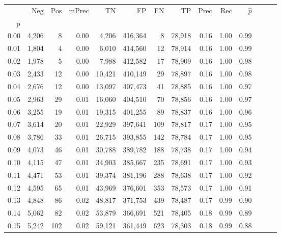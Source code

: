 \begin{tabular}{rrrrrrrrrrrrrr}
\toprule
{} &    Neg &    Pos & mPrec &       TN &       FP &      FN &      TP &  Prec &   Rec & $\hat{p}$ \\
p    &        &        &       &          &          &         &         &       &       &           \\
\midrule
0.00 &  4,206 &      8 &  0.00 &    4,206 &  416,364 &       8 &  78,918 &  0.16 &  1.00 &      0.99 \\
0.01 &  1,804 &      4 &  0.00 &    6,010 &  414,560 &      12 &  78,914 &  0.16 &  1.00 &      0.99 \\
0.02 &  1,978 &      5 &  0.00 &    7,988 &  412,582 &      17 &  78,909 &  0.16 &  1.00 &      0.98 \\
0.03 &  2,433 &     12 &  0.00 &   10,421 &  410,149 &      29 &  78,897 &  0.16 &  1.00 &      0.98 \\
0.04 &  2,676 &     12 &  0.00 &   13,097 &  407,473 &      41 &  78,885 &  0.16 &  1.00 &      0.97 \\
0.05 &  2,963 &     29 &  0.01 &   16,060 &  404,510 &      70 &  78,856 &  0.16 &  1.00 &      0.97 \\
0.06 &  3,255 &     19 &  0.01 &   19,315 &  401,255 &      89 &  78,837 &  0.16 &  1.00 &      0.96 \\
0.07 &  3,614 &     20 &  0.01 &   22,929 &  397,641 &     109 &  78,817 &  0.17 &  1.00 &      0.95 \\
0.08 &  3,786 &     33 &  0.01 &   26,715 &  393,855 &     142 &  78,784 &  0.17 &  1.00 &      0.95 \\
0.09 &  4,073 &     46 &  0.01 &   30,788 &  389,782 &     188 &  78,738 &  0.17 &  1.00 &      0.94 \\
0.10 &  4,115 &     47 &  0.01 &   34,903 &  385,667 &     235 &  78,691 &  0.17 &  1.00 &      0.93 \\
0.11 &  4,471 &     53 &  0.01 &   39,374 &  381,196 &     288 &  78,638 &  0.17 &  1.00 &      0.92 \\
0.12 &  4,595 &     65 &  0.01 &   43,969 &  376,601 &     353 &  78,573 &  0.17 &  1.00 &      0.91 \\
0.13 &  4,848 &     86 &  0.02 &   48,817 &  371,753 &     439 &  78,487 &  0.17 &  0.99 &      0.90 \\
0.14 &  5,062 &     82 &  0.02 &   53,879 &  366,691 &     521 &  78,405 &  0.18 &  0.99 &      0.89 \\
0.15 &  5,242 &    102 &  0.02 &   59,121 &  361,449 &     623 &  78,303 &  0.18 &  0.99 &      0.88 \\

\end{tabular}
